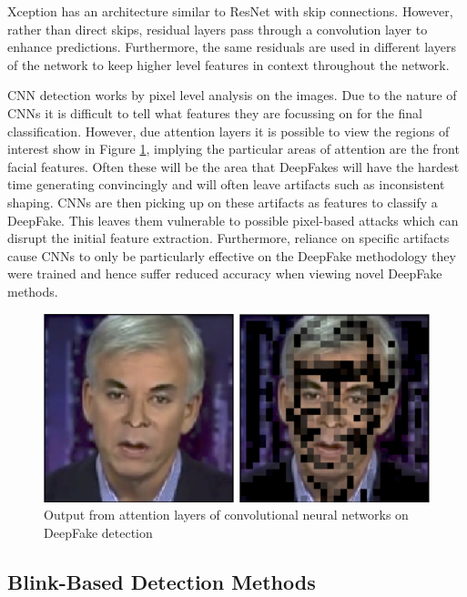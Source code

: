 Xception has an architecture similar to ResNet with skip connections. However, rather than direct skips, residual layers pass through a convolution layer to enhance predictions. Furthermore, the same residuals are used in different layers of the network to keep higher level features in context throughout the network.

CNN detection works by pixel level analysis on the images. Due to the nature of CNNs it is difficult to tell what features they are focussing on for the final classification. However, due attention layers it is possible to view the regions of interest show in Figure \ref{fig:attention}, implying the particular areas of attention are the front facial features. Often these will be the area that DeepFakes will have the hardest time generating convincingly and will often leave artifacts such as inconsistent shaping\cite{verdoliva2020media}. CNNs are then picking up on these artifacts as features to classify a DeepFake. This leaves them vulnerable to possible pixel-based attacks which can disrupt the initial feature extraction\cite{gandhi2020adversarial}. Furthermore, reliance on specific artifacts cause CNNs to only be particularly effective on the DeepFake methodology they were trained and hence suffer reduced accuracy when viewing novel DeepFake methods\cite{thing2023deepfake}.

\begin{figure}[h]
    \centering
    \includegraphics[width=0.5\linewidth]{dissertation//figures/attention-cnns.png}
    \caption{Output from attention layers of convolutional neural networks on DeepFake detection\cite{bonettini2021video}}
    \label{fig:attention}
\end{figure}

\subsection{Blink-Based Detection Methods}
\label{sec:blink-based-detection}


